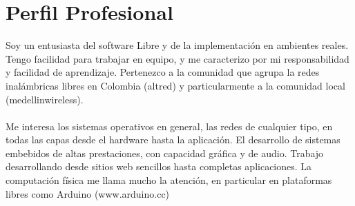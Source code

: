 \documentclass[a4paper, oneside, final, letter]{scrartcl}
\begin{document}
\section{Perfil Profesional}
Soy un entusiasta del software Libre y de la implementaci\'on en ambientes reales. Tengo facilidad para trabajar en equipo, y me caracterizo por mi responsabilidad y facilidad de aprendizaje. Pertenezco a la comunidad que agrupa la redes inal\'ambricas libres en Colombia (altred) y particularmente a la comunidad local (medellinwireless).\\
\\
Me interesa los sistemas operativos en general, las redes de cualquier tipo, en todas las capas desde el hardware hasta la aplicaci\'on. El desarrollo de sistemas embebidos de altas prestaciones, con capacidad gr\'afica y de audio. Trabajo desarrollando desde sitios web sencillos hasta completas aplicaciones.
La computaci\'on f\'isica me llama mucho la atenci\'on, en particular en plataformas libres como Arduino (www.arduino.cc)
\end{document}
